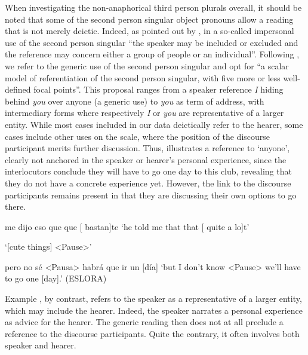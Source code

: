 \documentclass[output=paper]{langscibook}
\begin{document}
When investigating the non-anaphorical third person plurals overall, it should be noted that some of the second person singular object pronouns allow a reading that is not merely deictic. Indeed, as pointed out by \citet[4]{Posio2016}, in a so-called impersonal use of the second person singular “the speaker may be included or excluded and the reference may concern either a group of people or an individual”. Following \citet[89]{Kluge2012}, we refer to the generic use of the second person singular and opt for “a scalar model of referentiation of the second person singular, with five more or less well-defined focal points”. This proposal ranges from a speaker reference \textit{I} hiding behind \textit{you} over anyone (a generic use) to \textit{you} as term of address, with intermediary forms where respectively \textit{I} or \textit{you} are representative of a larger entity. While most cases included in our data deictically refer to the hearer, some cases include other uses on the scale, where the position of the discourse participant merits further discussion. Thus,  illustrates a reference to ‘anyone’, clearly not anchored in the speaker or hearer’s personal experience, since the interlocutors conclude they will have to go one day to this club, revealing that they do not have a concrete experience yet. However, the link to the discourse participants remains present in that they are discussing their own options to go there. 


\ea\label{ex:pierre:21}
\begin{xlist}[Speaker 2]
 me dijo eso que que {}{[}{}{ {bastan]te} }
 ‘he told me that that { [ } {quite a lo]t’} 

 ‘[cute things] <Pause>’

 pero no sé <Pausa> habrá que ir un [día]
 ‘but I don’t know <Pause> we’ll have to go one [day].’ (ESLORA)
\end{xlist}
\z 

Example , by contrast, refers to the speaker as a representative of a larger entity, which may include the hearer. Indeed, the speaker narrates a personal experience as advice for the hearer. The generic reading then does not at all preclude a reference to the discourse participants. Quite the contrary, it often involves both speaker and hearer. 
\end{document}
